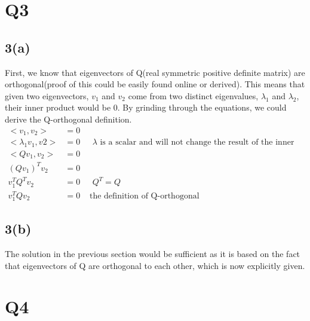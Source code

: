 \documentclass{article}
\begin{document}
\section{Q3}
\subsection*{3(a)}
First, we know that eigenvectors of Q(real symmetric positive definite matrix) are orthogonal(proof of this could be easily found online or derived). This means that given two eigenvectors, $v_1$ and $v_2$ come from two distinct eigenvalues, $\lambda_1$ and $\lambda_2$, their inner product would be 0. By grinding through the equations, we could derive the Q-orthogonal definition.
\begin{equation*}
\begin{aligned}
<v_1, v_2> &= 0&\\
<\lambda_1 v_1, v2> &= 0  &\mbox{  $\lambda$ is a scalar and will not change the result of the inner product}\\
<Q v_1, v_2> &= 0 &\\
(Q v_1)^Tv_2 &= 0 &\\
v_1^T Q^Tv_2 &= 0& \mbox{ $Q^T=Q$}\\
v_1^T Q v_2 &= 0 &\mbox{   the definition of Q-orthogonal}
\end{aligned}
\end{equation*}
\subsection*{3(b)}
The solution in the previous section would be sufficient as it is based on the fact that eigenvectors of Q are orthogonal to each other, which is now explicitly given.
\section{Q4}

\end{document}
